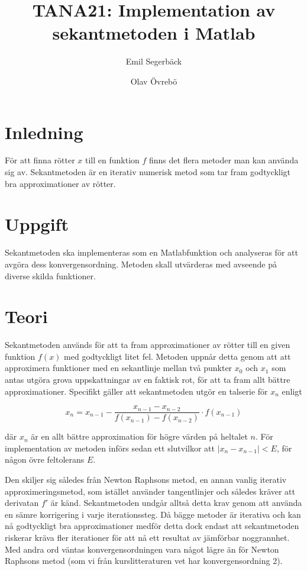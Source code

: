 \documentclass[12pt]{article}
\title{TANA21: Implementation av sekantmetoden i Matlab}
\author{Emil Segerbäck \and Olav Övrebö}
\begin{document}
\clearpage
\maketitle
\thispagestyle{empty}

\newpage
\setcounter{page}{1}

\section{Inledning}
För att finna rötter $x$ till en funktion $f$ finns det flera metoder man kan använda sig av. Sekantmetoden är en iterativ numerisk metod som tar fram godtyckligt bra approximationer av rötter.

\section{Uppgift}
Sekantmetoden ska implementeras som en Matlabfunktion och analyseras för att avgöra dess konvergensordning. Metoden skall utvärderas med avseende på diverse skilda funktioner.

\section{Teori}
Sekantmetoden används för att ta fram approximationer av rötter till en given funktion $f(x)$ med godtyckligt litet fel. Metoden uppnår detta genom att att approximera funktioner med en sekantlinje mellan två punkter $x_0$ och $x_1$ som antas utgöra grova uppskattningar av en faktisk rot, för att ta fram allt bättre approximationer. Specifikt gäller att sekantmetoden utgör en talserie för $x_n$ enligt

\[
x_{n} = x_{n-1} - \frac{x_{n-1} - x_{n-2}}{f(x_{n-1}) - f(x_{n-2})} \cdot f(x_{n-1})
\]

där $x_{n}$ är en allt bättre approximation för högre värden på heltalet $n$. För implementation av metoden införs sedan ett slutvilkor att $|x_{n} - x_{n-1}| < E$, för någon övre feltolerans $E$.

Den skiljer sig således från Newton Raphsons metod, en annan vanlig iterativ approximeringsmetod, som istället använder tangentlinjer och således kräver att derivatan $f'$ är känd. Sekantmetoden undgår alltså detta krav genom att använda en sämre korrigering i varje iterationssteg. Då bägge metoder är iterativa och kan nå godtyckligt bra approximationer medför detta dock endast att sekantmetoden riskerar kräva fler iterationer för att nå ett resultat av jämförbar noggrannhet. Med andra ord väntas konvergensordningen vara något lägre än för Newton Raphsons metod (som vi från kurslitteraturen vet har konvergensordning 2).
\end{document}
